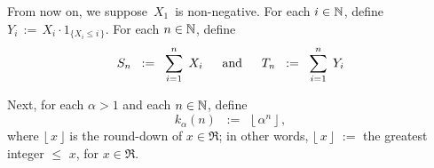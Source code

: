 \begin{enumerate}
\vskip 0.8cm
\noindent
From now on, we suppose \,$X_{1}$\, is non-negative.
For each $i \in \mathbb{N}$, define $Y_{i} \,:=\, X_{i} \cdot 1_{\{X_{i} \leq i\,\}}$.
For each $n \in \mathbb{N}$, define
\begin{equation*}
S_{n} \;\; := \;\; \overset{n}{\underset{i=1}{\sum}} \;\, X_{i}
\quad\;\;\textnormal{and}\quad\;\;
T_{n} \;\; := \;\; \overset{n}{\underset{i=1}{\sum}} \;\, Y_{i}
\end{equation*}

Next, for each $\alpha > 1$ and each $n \in \mathbb{N}$, define
\begin{equation*}
k_{\alpha}(n)
\;\; := \;\;
	\lfloor\, \alpha^{n} \,\rfloor\,,
\end{equation*}
where $\lfloor\,x\,\rfloor$ is the round-down of $x \in \Re$; in other words,
$\lfloor\,x\,\rfloor$ \;$:=$\; the greatest integer $\leq$ $x$, for $x \in \Re$.


\end{enumerate}
